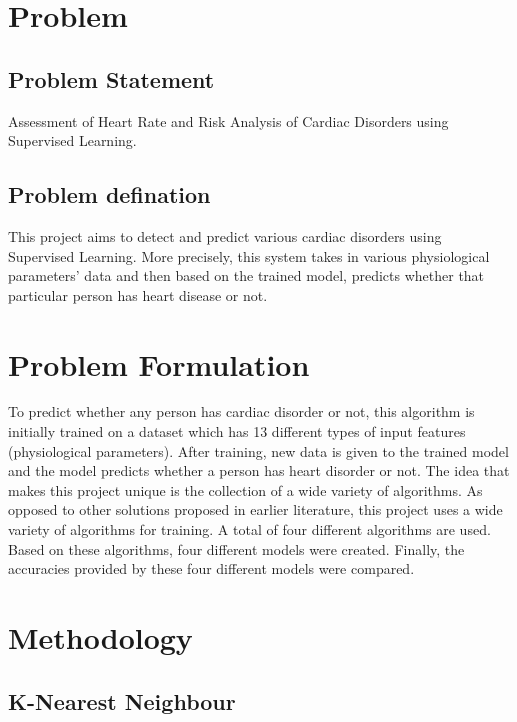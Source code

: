 \documentclass{article}
\begin{document}
\section{Problem}

\subsection{Problem Statement}
Assessment of Heart Rate and Risk Analysis of Cardiac Disorders using Supervised Learning.

\subsection{Problem defination}
This project aims to detect and predict various cardiac disorders using Supervised Learning. More precisely, this system takes in various physiological parameters’ data and then based on the trained model, predicts whether that particular person has heart disease or not.

\section{Problem Formulation}
To predict whether any person has cardiac disorder or not, this algorithm is initially trained on a dataset which has 13 different types of input features (physiological parameters). After training, new data is given to the trained model and the model predicts whether a person has heart disorder or not. The idea that makes this project unique is the collection of a wide variety of algorithms. As opposed to other solutions proposed in earlier literature, this project uses a wide variety of algorithms for training. A total of four different algorithms are used. Based on these algorithms, four different models were created. Finally, the accuracies provided by these four different models were compared.

\section{Methodology}

\subsection{K-Nearest Neighbour}
\end{document}
